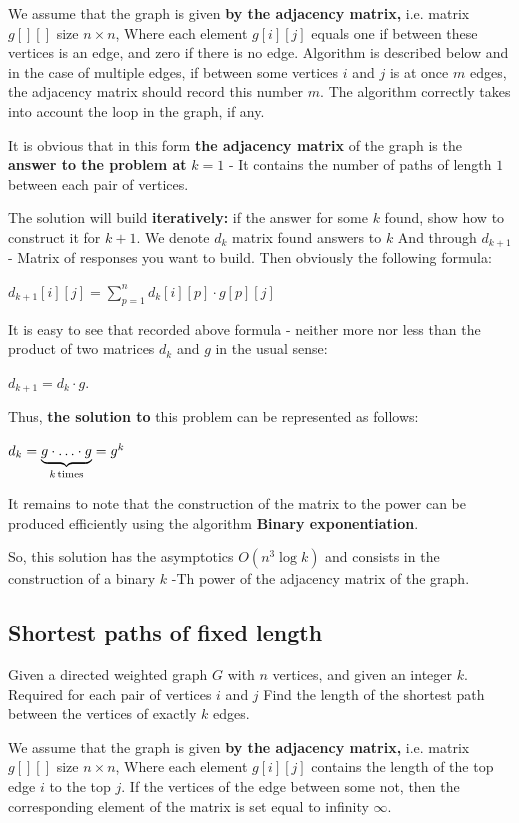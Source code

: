 We assume that the graph is given \textbf{by the adjacency matrix,} i.e. matrix $g [][]$ size $n \times n$, Where each element $g [i][j]$ equals one if between these vertices is an edge, and zero if there is no edge. Algorithm is described below and in the case of multiple edges, if between some vertices $i$ and $j$ is at once $m$ edges, the adjacency matrix should record this number $m$. The algorithm correctly takes into account the loop in the graph, if any.

It is obvious that in this form \textbf{the adjacency matrix} of the graph is the \textbf{answer to the problem at} \textbf{$k = 1$} - It contains the number of paths of length $1$ between each pair of vertices.

The solution will build \textbf{iteratively:} if the answer for some $k$ found, show how to construct it for $k +1$. We denote $d_k$ matrix found answers to $k$ And through $d_ {k +1}$ - Matrix of responses you want to build. Then obviously the following formula:

$d_{k+1}[i][j]=\sum_{p=1}^{n}d_{k}[i][p]\cdot g[p][j]$

It is easy to see that recorded above formula - neither more nor less than the product of two matrices $d_k$ and $g$ in the usual sense:

$d_ {k +1} = d_k \cdot g.$

Thus, \textbf{the solution to} this problem can be represented as follows:

$d_{k}=\underbrace{g\cdot\ldots\cdot g}_{k{\rm \, times}}=g^{k}$

It remains to note that the construction of the matrix to the power can be produced efficiently using the algorithm \textbf{Binary exponentiation}.

So, this solution has the asymptotics $O (n ^ 3 \log k)$ and consists in the construction of a binary $k$ -Th power of the adjacency matrix of the graph.

\subsection{ Shortest paths of fixed length }

Given a directed weighted graph $G$ with $n$ vertices, and given an integer $k$. Required for each pair of vertices $i$ and $j$ Find the length of the shortest path between the vertices of exactly $k$ edges.

We assume that the graph is given \textbf{by the adjacency matrix,} i.e. matrix $g [][]$ size $n \times n$, Where each element $g [i][j]$ contains the length of the top edge $i$ to the top $j$. If the vertices of the edge between some not, then the corresponding element of the matrix is ​​set equal to infinity $\infty$.

